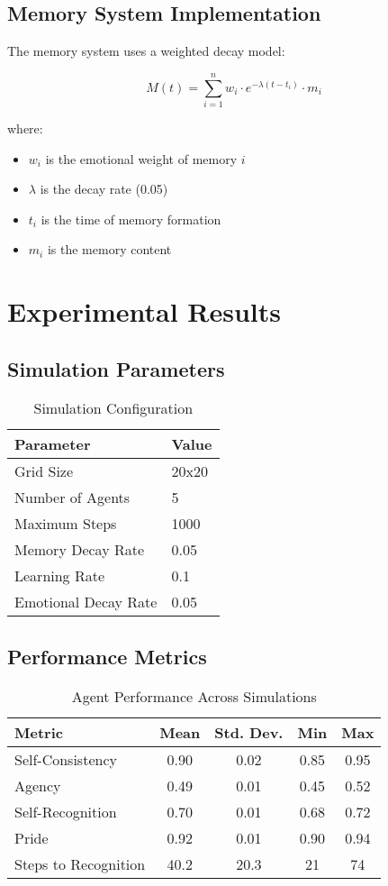 \documentclass[conference]{IEEEtran}
\begin{document}
\subsection{Memory System Implementation}
The memory system uses a weighted decay model:

\begin{equation}
M(t) = \sum_{i=1}^{n} w_i \cdot e^{-\lambda(t-t_i)} \cdot m_i
\end{equation}

where:
\begin{itemize}
    \item $w_i$ is the emotional weight of memory $i$
    \item $\lambda$ is the decay rate (0.05)
    \item $t_i$ is the time of memory formation
    \item $m_i$ is the memory content
\end{itemize}

\section{Experimental Results}
\subsection{Simulation Parameters}
\begin{table}[h]
\centering
\caption{Simulation Configuration}
\begin{tabular}{ll}
\toprule
Parameter & Value \\
\midrule
Grid Size & 20x20 \\
Number of Agents & 5 \\
Maximum Steps & 1000 \\
Memory Decay Rate & 0.05 \\
Learning Rate & 0.1 \\
Emotional Decay Rate & 0.05 \\
\bottomrule
\end{tabular}
\end{table}

\subsection{Performance Metrics}
\begin{table}[h]
\centering
\caption{Agent Performance Across Simulations}
\begin{tabular}{lcccc}
\toprule
Metric & Mean & Std. Dev. & Min & Max \\
\midrule
Self-Consistency & 0.90 & 0.02 & 0.85 & 0.95 \\
Agency & 0.49 & 0.01 & 0.45 & 0.52 \\
Self-Recognition & 0.70 & 0.01 & 0.68 & 0.72 \\
Pride & 0.92 & 0.01 & 0.90 & 0.94 \\
Steps to Recognition & 40.2 & 20.3 & 21 & 74 \\
\bottomrule
\end{tabular}
\end{table}
\end{document}
